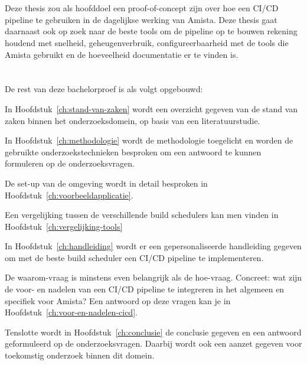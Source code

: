 \section{}
\label{sec:onderzoeksdoelstelling}

Deze thesis zou als hoofddoel een proof-of-concept zijn over hoe een CI/CD pipeline te gebruiken in de dagelijkse werking van Amista. 
Deze thesis gaat daarnaast ook op zoek naar de beste tools om de pipeline op te bouwen rekening houdend met snelheid, geheugenverbruik, configureerbaarheid met de tools die Amista gebruikt en de hoeveelheid documentatie er te vinden is.

\section{}
\label{sec:opzet-bachelorproef}


De rest van deze bachelorproef is als volgt opgebouwd:

In Hoofdstuk~\ref{ch:stand-van-zaken} wordt een overzicht gegeven van de stand van zaken binnen het onderzoeksdomein, op basis van een literatuurstudie.

In Hoofdstuk~\ref{ch:methodologie} wordt de methodologie toegelicht en worden de gebruikte onderzoekstechnieken besproken om een antwoord te kunnen formuleren op de onderzoeksvragen.

De set-up van de omgeving wordt in detail besproken in Hoofdstuk~\ref{ch:voorbeeldapplicatie}.

Een vergelijking tussen de verschillende build schedulers kan men vinden in Hoofdstuk~\ref{ch:vergelijking-tools}

In Hoofdstuk~\ref{ch:handleiding} wordt er een gepersonaliseerde handleiding gegeven om met de beste build scheduler een CI/CD pipeline te implementeren.

De waarom-vraag is minstens even belangrijk als de hoe-vraag. Concreet: wat zijn de voor- en nadelen van een CI/CD pipeline te integreren in het algemeen en specifiek voor Amista? Een antwoord op deze vragen kan je in Hoofdstuk~\ref{ch:voor-en-nadelen-cicd}.

Tenslotte wordt in Hoofdstuk~\ref{ch:conclusie} de conclusie gegeven en een antwoord geformuleerd op de onderzoeksvragen. Daarbij wordt ook een aanzet gegeven voor toekomstig onderzoek binnen dit domein.